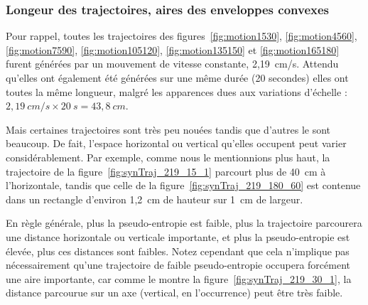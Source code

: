 	\subsubsection{Longeur des trajectoires, aires des enveloppes convexes}
	Pour rappel, toutes les trajectoires des figures~\ref{fig:motion1530}, \ref{fig:motion4560}, \ref{fig:motion7590}, \ref{fig:motion105120}, \ref{fig:motion135150} et \ref{fig:motion165180} furent générées par un mouvement de vitesse constante, 2,19~cm/s. Attendu qu'elles ont également été générées sur une même durée (20 secondes) elles ont toutes la même longueur, malgré les apparences dues aux variations d'échelle : $2,19~cm/s \times 20~s = 43,8~cm$.
	
	Mais certaines trajectoires sont très peu \og nouées \fg{} tandis que d'autres le sont beaucoup. De fait, l'espace horizontal ou vertical qu'elles occupent peut varier considérablement. Par exemple, comme nous le mentionnions plus haut,	la trajectoire de la figure~\ref{fig:synTraj_219_15_1} parcourt plus de 40~cm à l'horizontale, tandis que celle de la figure~\ref{fig:synTraj_219_180_60} est contenue dans un rectangle d'environ 1,2~cm de hauteur sur 1~cm de largeur.
	
	En règle générale, plus la pseudo-entropie est faible, plus la trajectoire parcourera une distance horizontale ou verticale importante, et plus la pseudo-entropie est élevée, plus ces distances sont faibles. Notez cependant que cela n'implique pas nécessairement qu'une trajectoire de faible pseudo-entropie occupera forcément une aire importante, car comme le montre la figure~\ref{fig:synTraj_219_30_1}, la distance parcourue sur un axe (vertical, en l'occurrence) peut être très faible.
	
